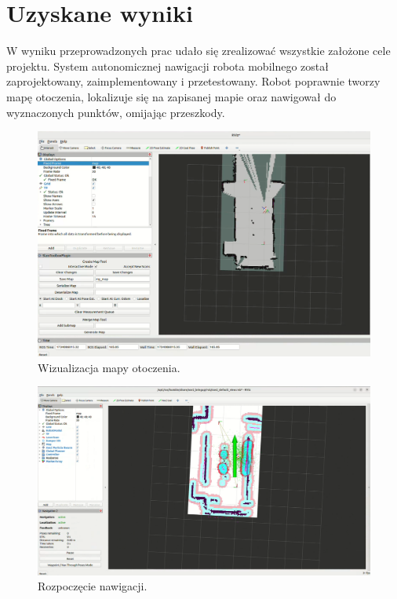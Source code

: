 \documentclass[a4paper,twoside,12pt]{book}
\begin{document}
\section{Uzyskane wyniki}
W wyniku przeprowadzonych prac udało się zrealizować wszystkie założone cele projektu. System autonomicznej nawigacji robota mobilnego został zaprojektowany, zaimplementowany i przetestowany. Robot poprawnie tworzy mapę otoczenia, lokalizuje się na zapisanej mapie oraz nawigował do wyznaczonych punktów, omijając przeszkody. 
\begin{figure}[!hb]
	\centering
	\includegraphics[width=1\textwidth]{images/save-map.png}
	\caption{Wizualizacja mapy otoczenia.}
	\label{fig:save-map2}
\end{figure}
\newpage
\begin{figure}[!hb]
	\centering
	\includegraphics[width=1\textwidth]{images/launch-nav3.png}
	\caption{Rozpoczęcie nawigacji.}
	\label{fig:nav-map34}
\end{figure}
\end{document}
